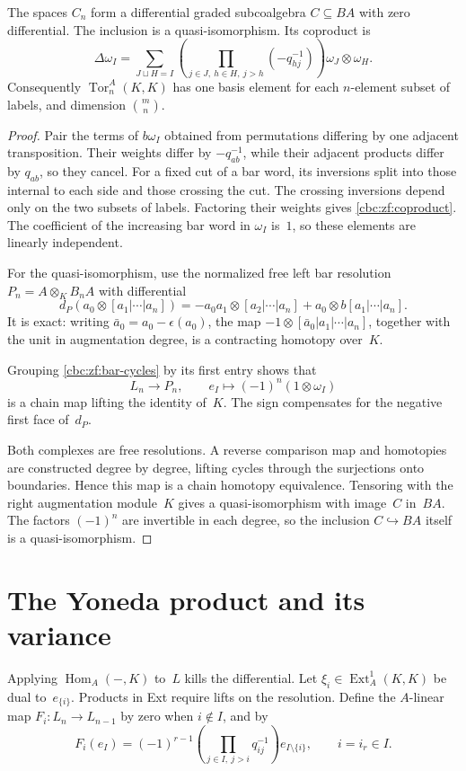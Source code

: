\begin{theorem}\label{cbc:zf:bar-model}
The spaces $C_n$ form a differential graded subcoalgebra
$C\subseteq BA$ with zero differential.  The inclusion is a
quasi-isomorphism.  Its coproduct is
\begin{equation}\label{cbc:zf:coproduct}
 \Delta\omega_I=\sum_{J\sqcup H=I}
   \left(\prod_{j\in J,\ h\in H,\ j>h}(-q_{hj}^{-1})\right)
            \omega_J\otimes\omega_H.
\end{equation}
Consequently $\operatorname{Tor}^A_n(K,K)$ has one basis element for each
$n$-element subset of labels, and dimension $\binom mn$.
\end{theorem}
\begin{proof}
Pair the terms of $b\omega_I$ obtained from permutations differing by
one adjacent transposition.  Their weights differ by $-q_{ab}^{-1}$,
while their adjacent products differ by $q_{ab}$, so they cancel.
For a fixed cut of a bar word, its inversions split into those internal
to each side and those crossing the cut.  The crossing inversions depend
only on the two subsets of labels.  Factoring their weights gives
\eqref{cbc:zf:coproduct}.  The coefficient of the increasing bar word
in $\omega_I$ is~$1$, so these elements are linearly independent.

For the quasi-isomorphism, use the normalized free left bar resolution
$P_n=A\otimes_K B_nA$ with differential
\[
 d_P(a_0\otimes[a_1|\cdots|a_n])
 =-a_0a_1\otimes[a_2|\cdots|a_n]
   +a_0\otimes b[a_1|\cdots|a_n].
\]
It is exact: writing $\bar a_0=a_0-\epsilon(a_0)$, the map
$-1\otimes[\bar a_0|a_1|\cdots|a_n]$, together with the unit in
augmentation degree, is a contracting homotopy over~$K$.

Grouping \eqref{cbc:zf:bar-cycles} by its first entry shows that
\[
 L_n\longrightarrow P_n,\qquad
 e_I\longmapsto(-1)^n(1\otimes\omega_I)
\]
is a chain map lifting the identity of~$K$.
The sign compensates for the negative first face of~$d_P$.

Both complexes are free resolutions.  A reverse comparison map and
homotopies are constructed degree by degree, lifting cycles through the
surjections onto boundaries.  Hence this map is a
chain homotopy equivalence.  Tensoring with the right augmentation
module~$K$ gives a quasi-isomorphism with image~$C$ in~$BA$.
The factors $(-1)^n$ are invertible in each degree, so the inclusion
$C\hookrightarrow BA$ itself is a quasi-isomorphism.
\end{proof}

\section{The Yoneda product and its variance}
Applying $\operatorname{Hom}_A(-,K)$ to~$L$ kills the differential.
Let $\xi_i\in\operatorname{Ext}^1_A(K,K)$ be dual to~$e_{\{i\}}$.
Products in Ext require lifts on the resolution.  Define the $A$-linear
map $F_i:L_n\to L_{n-1}$ by zero when $i\notin I$, and by
\[
 F_i(e_I)=(-1)^{r-1}
       \left(\prod_{j\in I,\ j>i}q_{ij}^{-1}\right)
       e_{I\setminus\{i\}},\qquad i=i_r\in I.
\]

